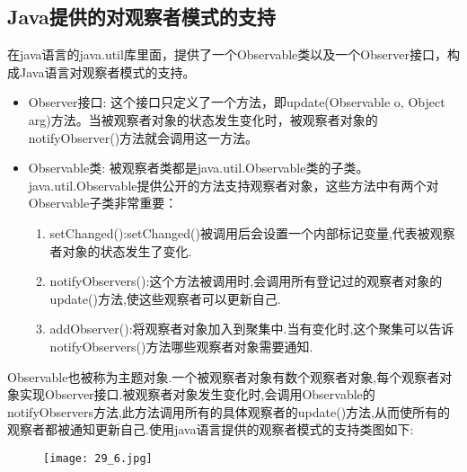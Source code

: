 \documentclass[../main.tex]{subfiles}
\begin{document}
\subsection{Java提供的对观察者模式的支持}
在java语言的java.util库里面，提供了一个Observable类以及一个Observer接口，构成Java语言对观察者模式的支持。
\begin{itemize}
  \item Observer接口: 这个接口只定义了一个方法，即update(Observable o, Object arg)方法。当被观察者对象的状态发生变化时，被观察者对象的notifyObserver()方法就会调用这一方法。
  \item Observable类: 被观察者类都是java.util.Observable类的子类。 java.util.Observable提供公开的方法支持观察者对象，这些方法中有两个对Observable子类非常重要：
    \begin{enumerate}
      \item setChanged():setChanged()被调用后会设置一个内部标记变量,代表被观察者对象的状态发生了变化.
      \item notifyObservers():这个方法被调用时,会调用所有登记过的观察者对象的update()方法,使这些观察者可以更新自己.
      \item addObserver():将观察者对象加入到聚集中.当有变化时,这个聚集可以告诉notifyObservers()方法哪些观察者对象需要通知.
    \end{enumerate}
\end{itemize}
%

%
Observable也被称为主题对象.一个被观察者对象有数个观察者对象,每个观察者对象实现Observer接口.被观察者对象发生变化时,会调用Observable的notifyObservers方法,此方法调用所有的具体观察者的update()方法,从而使所有的观察者都被通知更新自己.使用java语言提供的观察者模式的支持类图如下:
%
\begin{figure}[H]
  \texttt{[image: 29\_6.jpg]}
\end{figure}
%
\end{document}
